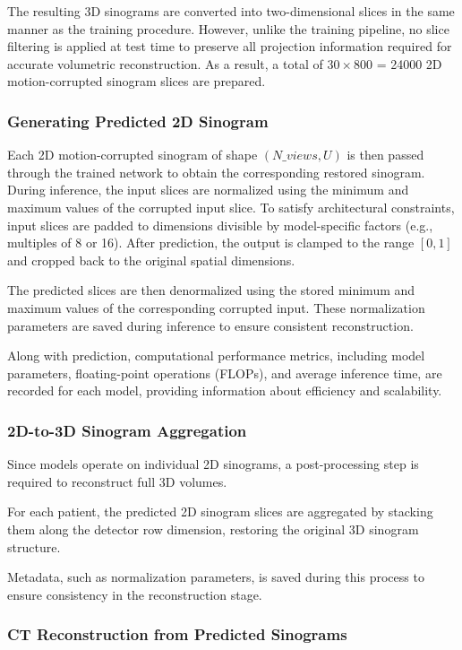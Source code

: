 The resulting 3D sinograms are converted into two-dimensional slices in the same manner as the training procedure. However, unlike the training pipeline, no slice filtering is applied at test time to preserve all projection information required for accurate volumetric reconstruction. As a result, a total of $30 \times 800$ = 24000 2D motion-corrupted sinogram slices are prepared.

\subsubsection{Generating Predicted 2D Sinogram}
Each 2D motion-corrupted sinogram of shape $(N\_{views}, U)$ is then passed through the trained network to obtain the corresponding restored sinogram. During inference, the input slices are normalized using the minimum and maximum values of the corrupted input slice. To satisfy architectural constraints, input slices are padded to dimensions divisible by model-specific factors (e.g., multiples of 8 or 16). After prediction, the output is clamped to the range $[0,1]$ and cropped back to the original spatial dimensions.

The predicted slices are then denormalized using the stored minimum and maximum values of the corresponding corrupted input. These normalization parameters are saved during inference to ensure consistent reconstruction.

Along with prediction, computational performance metrics, including model parameters, floating-point operations (FLOPs), and average inference time, are recorded for each model, providing information about efficiency and scalability.

\subsubsection{2D-to-3D Sinogram Aggregation}


Since models operate on individual 2D sinograms, a post-processing step is required to reconstruct full 3D volumes.

For each patient, the predicted 2D sinogram slices are aggregated by stacking them along the detector row dimension, restoring the original 3D sinogram structure. 

Metadata, such as normalization parameters, is saved during this process to ensure consistency in the reconstruction stage.

\subsubsection{CT Reconstruction from Predicted Sinograms  }



